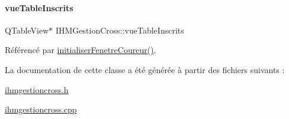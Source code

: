 \paragraph{\texorpdfstring{vue\+Table\+Inscrits}{vueTableInscrits}}
{\footnotesize\ttfamily Q\+Table\+View$\ast$ I\+H\+M\+Gestion\+Cross\+::vue\+Table\+Inscrits\hspace{0.3cm}{\ttfamily [private]}}



Référencé par \hyperlink{class_i_h_m_gestion_cross_aa5d9de499a66e52b843c4ef4c6074a60}{initialiser\+Fenetre\+Coureur()}.



La documentation de cette classe a été générée à partir des fichiers suivants \+:\begin{DoxyCompactItemize}
\item 
\hyperlink{ihmgestioncross_8h}{ihmgestioncross.\+h}\item 
\hyperlink{ihmgestioncross_8cpp}{ihmgestioncross.\+cpp}\end{DoxyCompactItemize}
